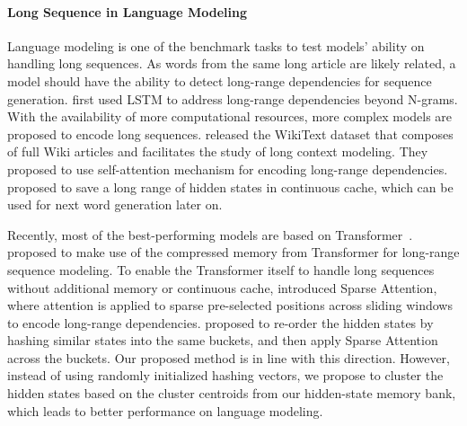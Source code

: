 \documentclass[11pt,a4paper]{article}
\begin{document}
\paragraph{Long Sequence in Language Modeling}
Language modeling is one of the benchmark tasks to test models' ability on handling long sequences.
As words from the same long article are likely related, a model should have the ability to detect long-range dependencies for sequence generation.
\citet{sundermeyer2012lstm} first used LSTM to address long-range dependencies beyond N-grams.
With the availability of more computational resources, more complex models are proposed to encode long sequences. 
\citet{merity2016pointer} released the WikiText dataset that composes of full Wiki articles and facilitates the study of long context modeling. They proposed to use self-attention mechanism for encoding long-range dependencies.
\citet{grave2016improving} proposed to save a long range of hidden states in continuous cache, which can be used for next word generation later on.

Recently, most of the best-performing models are based on Transformer~\cite{transformer}.
\citet{rae2019compressive} proposed to make use of the compressed memory from Transformer for long-range sequence modeling.
To enable the Transformer itself to handle long sequences without additional memory or continuous cache, \citet{sparsetransf,longformer} introduced Sparse Attention, where attention is applied to sparse pre-selected positions across sliding windows to encode long-range dependencies.
\citet{reformer} proposed to re-order the hidden states by hashing similar states into the same buckets, and then apply Sparse Attention across the buckets.
Our proposed method is in line with this direction. 
However, instead of using randomly initialized hashing vectors, we propose to cluster the hidden states based on the cluster centroids from our hidden-state memory bank, which leads to better performance on language modeling.
\end{document}

